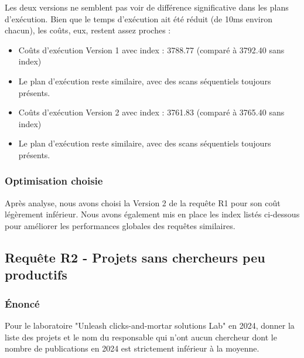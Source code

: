 \documentclass[12pt,a4paper]{article}
\begin{document}
Les deux versions ne semblent pas voir de différence significative dans les plans d'exécution. Bien que le temps d'exécution ait été réduit (de 10ms environ chacun), les coûts, eux, restent assez proches :
\begin{itemize}
    \item Coûts d'exécution Version 1 avec index : 3788.77 (comparé à 3792.40 sans index)
    \item Le plan d'exécution reste similaire, avec des scans séquentiels toujours présents.
    \item Coûts d'exécution Version 2 avec index : 3761.83 (comparé à 3765.40 sans index)
    \item Le plan d'exécution reste similaire, avec des scans séquentiels toujours présents.
\end{itemize}

\subsubsection{Optimisation choisie}
Après analyse, nous avons choisi la Version 2 de la requête R1 pour son coût légèrement inférieur. Nous avons également mis en place les index listés ci-dessous pour améliorer les performances globales des requêtes similaires.

\subsection{Requête R2 - Projets sans chercheurs peu productifs}

\subsubsection{Énoncé}
Pour le laboratoire "Unleash clicks-and-mortar solutions Lab" en 2024, donner la liste des projets et le nom du responsable qui n'ont aucun chercheur dont le nombre de publications en 2024 est strictement inférieur à la moyenne.
\end{document}
